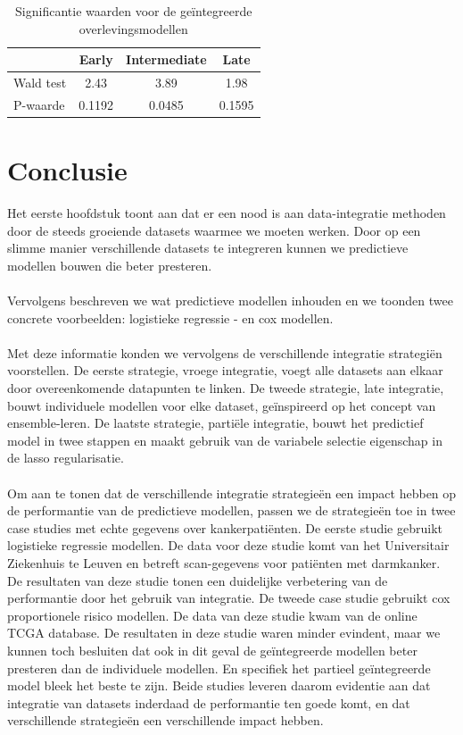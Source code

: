 \begin{abstract*}
\begin{table}
	\centering
	\begin{tabular}{lccc} 
		\toprule
		& Early & Intermediate & Late\\
		\midrule
		Wald test 					& 2.43 & 3.89 & 1.98 \\
		P-waarde 					& 0.1192 & 0.0485 & 0.1595 \\
		\bottomrule
	\end{tabular}
	\caption{Significantie waarden voor de ge\"integreerde overlevingsmodellen}
	\label{tab:D:evaluation-surv-integrated}
\end{table}

\section{Conclusie}
\label{cha:D:conclusie}
Het eerste hoofdstuk toont aan dat er een nood is aan data-integratie methoden door de steeds groeiende datasets waarmee we moeten werken. Door op een slimme manier verschillende datasets te integreren kunnen we predictieve modellen bouwen die beter presteren. \\ \\
Vervolgens beschreven we wat predictieve modellen inhouden en we toonden twee concrete voorbeelden: logistieke regressie - en cox modellen.  \\ \\
Met deze informatie konden we vervolgens de verschillende integratie strategi\"en voorstellen. De eerste strategie, vroege integratie, voegt alle datasets aan elkaar door overeenkomende datapunten te linken. De tweede strategie, late integratie, bouwt individuele modellen voor elke dataset, ge\"inspireerd op het concept van ensemble-leren. De laatste strategie, parti\"ele integratie, bouwt het predictief model in twee stappen en maakt gebruik van de variabele selectie eigenschap in de lasso regularisatie. \\ \\
Om aan te tonen dat de verschillende integratie strategie\"en een impact hebben op de performantie van de predictieve modellen, passen we de strategie\"en toe in twee case studies met echte gegevens over kankerpati\"enten. De eerste studie gebruikt logistieke regressie modellen. De data voor deze studie komt van het Universitair Ziekenhuis te Leuven en betreft scan-gegevens voor pati\"enten met darmkanker. De resultaten van deze studie tonen een duidelijke verbetering van de performantie door het gebruik van integratie. De tweede case studie gebruikt cox proportionele risico modellen. De data van deze studie kwam van de online TCGA database. De resultaten in deze studie waren minder evindent, maar we kunnen toch besluiten dat ook in dit geval de ge\"integreerde modellen beter presteren dan de individuele modellen. En specifiek het partieel ge\"integreerde model bleek het beste te zijn. Beide studies leveren daarom evidentie aan dat integratie van datasets inderdaad de performantie ten goede komt, en dat verschillende strategie\"en een verschillende impact hebben. \\ \\

\end{abstract*}
